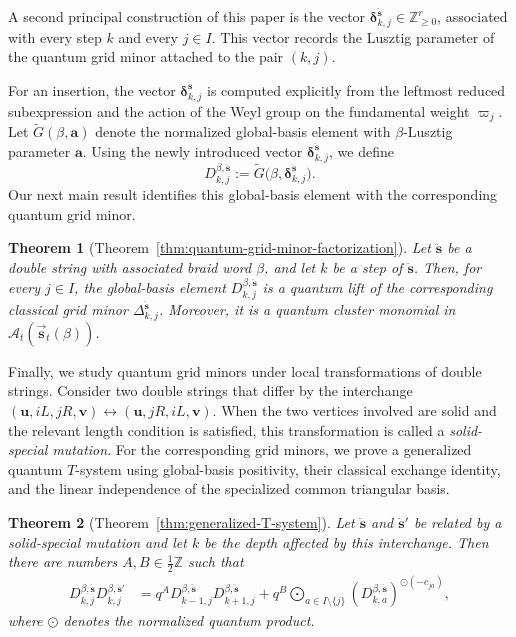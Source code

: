 \documentclass[12pt, reqno]{amsart}
\theoremstyle{plain}
\newtheorem{theorem}{Theorem}[section]
\theoremstyle{definition}
\numberwithin{equation}{section}
\newcommand{\ZZ}{\mathbb{Z}}
\begin{document}
 A second principal construction of
this paper is the vector
\(\boldsymbol\delta_{k,j}^{\ddot{\mathbf s}}\in\ZZ_{\geq0}^r\), associated
with every step \(k\) and every \(j\in I\). This vector
records the Lusztig parameter of the quantum grid minor attached to
the pair \((k,j)\).

For an insertion, the vector
\(\boldsymbol\delta_{k,j}^{\ddot{\mathbf s}}\) is computed explicitly from the
leftmost reduced subexpression and the action of the Weyl group on
the fundamental weight \(\varpi_j\). Let
\(\widetilde G(\beta,\mathbf a)\) denote the normalized
global-basis element with \(\beta\)-Lusztig parameter \(\mathbf a\).
Using the newly introduced vector
\(\boldsymbol\delta_{k,j}^{\ddot{\mathbf s}}\), we define
\[D_{k,j}^{\beta,\ddot{\mathbf s}}
:=
\widetilde G
\bigl(\beta,\boldsymbol\delta_{k,j}^{\ddot{\mathbf s}}\bigr).\]
Our next main result identifies this global-basis element with the
corresponding quantum grid minor.

\begin{theorem}[Theorem~\ref{thm:quantum-grid-minor-factorization}]
\label{thm:intro-quantum-grid-minors}
Let \(\ddot{\mathbf s}\) be a double string with associated braid
word \(\beta\), and let \(k\) be a step of $\ddot{\mathbf{s}}$. Then, for every
\(j\in I\), the global-basis element
\(D_{k,j}^{\beta,\ddot{\mathbf s}}\) is a quantum lift of the
corresponding classical grid minor
\(\Delta_{k,j}^{\ddot{\mathbf s}}\). Moreover, it is a quantum
cluster monomial in
\(\mathcal A_t(\overrightarrow{\mathbf s}_t(\beta))\).
\end{theorem}

Finally, we study quantum grid minors under local transformations of
double strings. Consider two double strings that differ by the
interchange
\((\mathbf u,iL,jR,\mathbf v)
\leftrightarrow
(\mathbf u,jR,iL,\mathbf v)\).
When the two vertices involved are solid and the relevant length
condition is satisfied, this transformation is called a
\emph{solid-special mutation}. For the corresponding grid minors,
we prove a generalized quantum \(T\)-system using global-basis
positivity, their classical exchange identity, and the linear
independence of the specialized common triangular basis.

\begin{theorem}[Theorem~\ref{thm:generalized-T-system}]
\label{thm:intro-quantum-grid-T-system}
Let \(\ddot{\mathbf s}\) and \(\ddot{\mathbf s}'\) be related by a
solid-special mutation and let $k$ be the depth affected by this interchange. Then there are numbers
\(A,B\in\frac12\ZZ\) such that
\begin{equation}\label{eq:intro-quantum-grid-T-system}
\begin{aligned}
    D_{k,j}^{\beta,\ddot{\mathbf s}}
    D_{k,j}^{\beta,\ddot{\mathbf s}'}
    &=
    q^A
    D_{k-1,j}^{\beta,\ddot{\mathbf s}}
    D_{k+1,j}^{\beta,\ddot{\mathbf s}}+
    q^B
    \bigodot_{a\in I\setminus\{j\}}
    \left(
        D_{k,a}^{\beta,\ddot{\mathbf s}}
    \right)^{\odot(-c_{ja})},
\end{aligned}
\end{equation}
where \(\odot\) denotes the normalized quantum product. 
\end{theorem}
\end{document}

